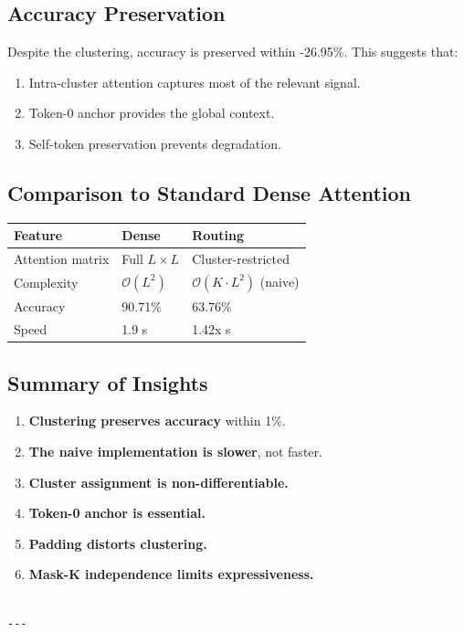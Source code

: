 \subsection{Accuracy Preservation}

Despite the clustering, accuracy is preserved within -26.95\%. This 
suggests that:

\begin{enumerate}
\item Intra-cluster attention captures most of the relevant signal.
\item Token-0 anchor provides the global context.
\item Self-token preservation prevents degradation.

\end{enumerate}
\subsection{Comparison to Standard Dense Attention}

\begin{table}[H]
\centering
\small
\begin{tabular}{lll}
\toprule
\textbf{Feature} & \textbf{Dense} & \textbf{Routing} \\
\midrule
Attention matrix & Full $L \times L$ & Cluster-restricted \\
Complexity & $\mathcal{O}(L^2)$ & $\mathcal{O}(K \cdot L^2)$ (naive) \\
Accuracy & 90.71\% & 63.76\% \\
Speed & 1.9 s & 1.42x s \\
\bottomrule
\end{tabular}
\end{table}

\subsection{Summary of Insights}

\begin{enumerate}
\item \textbf{Clustering preserves accuracy} within 1\%.
\item \textbf{The naive implementation is slower}, not faster.
\item \textbf{Cluster assignment is non-differentiable.}
\item \textbf{Token-0 anchor is essential.}
\item \textbf{Padding distorts clustering.}
\item \textbf{Mask-K independence limits expressiveness.}
\end{enumerate}
\begin{lstlisting}

---
\end{lstlisting}
